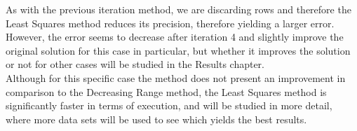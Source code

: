 As with the previous iteration method, we are discarding rows and therefore the Least Squares method reduces its precision, therefore yielding a larger error. However, the error seems to decrease after iteration 4 and slightly improve the original solution for this case in particular, but whether it improves the solution or not for other cases will be studied in the Results chapter. \\

Although for this specific case the method does not present an improvement in comparison to the Decreasing Range method, the Least Squares method is significantly faster in terms of execution, and will be studied in more detail, where more data sets will be used to see which yields the best results.
